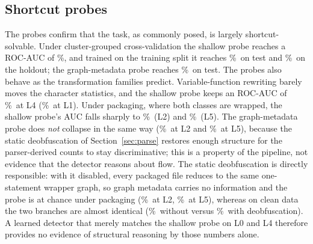 \documentclass[pdflatex,sn-mathphys-num]{sn-jnl}
\begin{document}
\subsection{Shortcut probes}\label{sec:r-probe}
The probes confirm that the task, as commonly posed, is largely
shortcut-solvable. Under cluster-grouped cross-validation the shallow probe
reaches a ROC-AUC of \ProbeShallowAucCV\%, and trained on the training split it
reaches \ProbeShallowAucTest\%\ on test and \ProbeShallowAucHoldout\%\ on the
holdout; the graph-metadata probe reaches \ProbeGraphmetaAucTest\%\ on test. The
probes also behave as the transformation families predict. Variable-function
rewriting barely moves the character statistics, and the shallow probe keeps an
ROC-AUC of \ProbeShallowAucLFour\%\ at L4 (\ProbeShallowAucLOne\%\ at L1). Under
packaging, where both classes are wrapped, the shallow probe's AUC falls sharply
to \ProbeShallowAucLTwo\%\ (L2) and \ProbeShallowAucLFive\%\ (L5). The
graph-metadata probe does \emph{not} collapse in the same way
(\ProbeGraphmetaAucLTwo\%\ at L2 and \ProbeGraphmetaAucLFive\%\ at L5), because the
static deobfuscation of Section~\ref{sec:parse} restores enough structure for
the parser-derived counts to stay discriminative; this is a property of the
pipeline, not evidence that the detector reasons about flow. The static
deobfuscation is directly responsible: with it disabled, every packaged file
reduces to the same one-statement wrapper graph, so graph metadata carries no
information and the probe is at chance under packaging
(\ProbeGraphmetaNoDeobfAucLTwo\%\ at L2, \ProbeGraphmetaNoDeobfAucLFive\%\ at L5),
whereas on clean data the two branches are almost identical
(\ProbeGraphmetaNoDeobfAucTest\%\ without versus \ProbeGraphmetaAucTest\%\ with
deobfuscation). A learned detector that merely matches the shallow probe on L0
and L4 therefore provides no evidence of structural reasoning by those numbers
alone.
\end{document}
